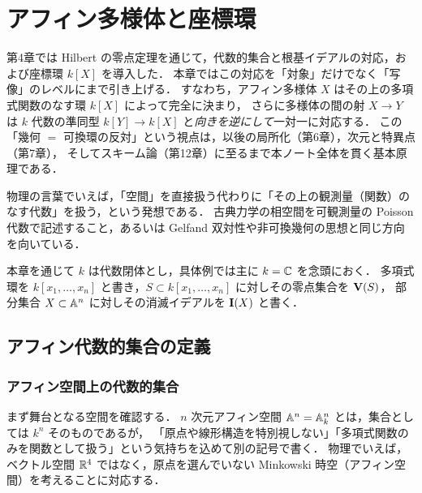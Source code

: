 \chapter{アフィン多様体と座標環}
\label{ch:ch05}

\begin{chapterlead}
第4章では Hilbert の零点定理を通じて，代数的集合と根基イデアルの対応，および座標環 $k[X]$ を導入した．
本章ではこの対応を「対象」だけでなく「写像」のレベルにまで引き上げる．
すなわち，アフィン多様体 $X$ はその上の多項式関数のなす環 $k[X]$ によって完全に決まり，
さらに多様体の間の射 $X\to Y$ は $k$ 代数の準同型 $k[Y]\to k[X]$ と\emph{向きを逆にして}一対一に対応する．
この「幾何 $=$ 可換環の反対」という視点は，以後の局所化（第6章），次元と特異点（第7章），
そしてスキーム論（第12章）に至るまで本ノート全体を貫く基本原理である．

物理の言葉でいえば，「空間」を直接扱う代わりに「その上の観測量（関数）のなす代数」を扱う，という発想である．
古典力学の相空間を可観測量の Poisson 代数で記述すること，あるいは Gelfand 双対性や非可換幾何の思想と同じ方向を向いている．
\end{chapterlead}

本章を通じて $k$ は代数閉体とし，具体例では主に $k=\mathbb{C}$ を念頭におく．
多項式環を $k[x_1,\dots,x_n]$ と書き，$S\subset k[x_1,\dots,x_n]$ に対しその零点集合を $\mathbf{V}(S)$，
部分集合 $X\subset \mathbb{A}^n$ に対しその消滅イデアルを $\mathbf{I}(X)$ と書く．

\section{アフィン代数的集合の定義}

\subsection{アフィン空間上の代数的集合}

まず舞台となる空間を確認する．
$n$ 次元アフィン空間 $\mathbb{A}^n=\mathbb{A}^n_k$ とは，集合としては $k^n$ そのものであるが，
「原点や線形構造を特別視しない」「多項式関数のみを関数として扱う」という気持ちを込めて別の記号で書く．
物理でいえば，ベクトル空間 $\mathbb{R}^4$ ではなく，原点を選んでいない Minkowski 時空（アフィン空間）を考えることに対応する．


